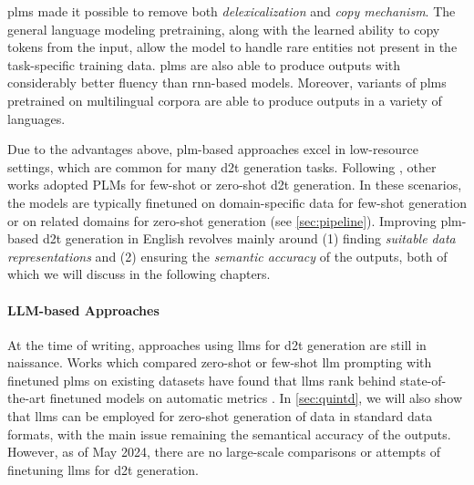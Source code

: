 {\acp{plm} made it possible to remove both \emph{delexicalization} and \emph{copy mechanism}. The general language modeling pretraining, along with the learned ability to copy tokens from the input, allow the model to handle rare entities not present in the task-specific training data. \acp{plm} are also able to produce outputs with considerably better fluency than \ac{rnn}-based models. Moreover, variants of \acp{plm} pretrained on multilingual corpora \cite{liuMultilingualDenoisingPretraining2020,xueMT5MassivelyMultilingual2021} are able to produce outputs in a variety of languages.

Due to the advantages above, \ac{plm}-based approaches excel in low-resource settings, which are common for many \ac{d2t} generation tasks. Following \citet{chenFewShotNLGPreTrained2019}, other works adopted PLMs for few-shot or zero-shot \ac{d2t} generation. In these scenarios, the models are typically finetuned on domain-specific data for few-shot generation \cite{changNeuralDatatoTextGeneration2021,suFewShotTabletoTextGeneration2021} or on related domains for zero-shot generation (see \autoref{sec:pipeline}). Improving \ac{plm}-based \ac{d2t} generation in English revolves mainly around (1) finding \emph{suitable data representations} and (2) ensuring the \emph{semantic accuracy} of the outputs, both of which we will discuss in the following chapters.

\paragraph{LLM-based Approaches} At the time of writing, approaches using \acp{llm} for \ac{d2t} generation are still in naissance. Works which compared zero-shot or few-shot \ac{llm} prompting with finetuned \acp{plm} on existing datasets have found that \acp{llm} rank behind state-of-the-art finetuned models on automatic metrics \cite{axelssonUsingLargeLanguage2023,yuanEvaluatingGenerativeModels2023}. In \autoref{sec:quintd}, we will also show that \acp{llm} can be employed for zero-shot generation of data in standard data formats, with the main issue remaining the semantical accuracy of the outputs. However, as of May 2024, there are no large-scale comparisons or attempts of finetuning \acp{llm} for \ac{d2t} generation.


}
